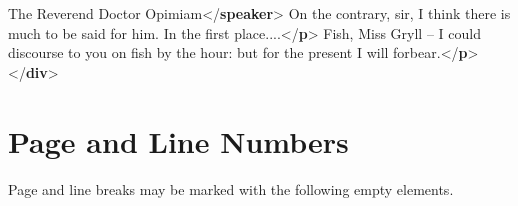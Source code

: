 \documentclass[11pt,twoside]{article}\makeatletter
\makeatletter
\renewcommand\section{\@startsection {section}{1}{\z@}%
     {-1.75ex \@plus -0.5ex \@minus -.2ex}%
     {0.5ex \@plus .2ex}%
     {\reset@font\Large\bfseries\sffamily}}
\def\DivI{\section}
\def\DivI{\chapter}
\makeatother
\begin{document}
\begin{shaded}
\hspace*{1em}The Reverend Doctor Opimiam{</\textbf{speaker}>}\mbox{}\newline 
\hspace*{1em}On the contrary, sir, I think there is much to be said for him.\mbox{}\newline 
\hspace*{1em}\hspace*{1em}\hspace*{1em}\hspace*{1em} In the first place....{</\textbf{p}>}\mbox{}\newline 
\hspace*{1em}Fish, Miss Gryll -- I could discourse to you on fish by\mbox{}\newline 
\hspace*{1em}\hspace*{1em}\hspace*{1em}\hspace*{1em} the hour: but for the present I will forbear.{</\textbf{p}>}\mbox{}\newline 
{}\mbox{}\newline 
{</\textbf{div}>}\end{shaded}\egroup\par 
\DivI[Page and Line Numbers]{Page and Line Numbers}\label{U5-pln}\par Page and line breaks may be marked with the following empty
elements.
\end{document}

